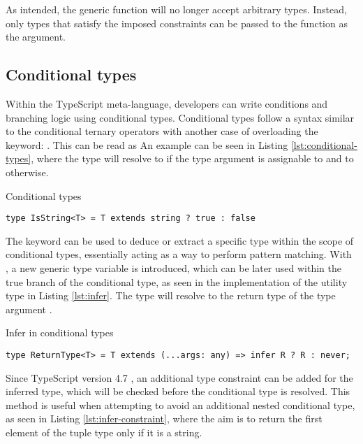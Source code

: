 As intended, the generic function will no longer accept arbitrary types. Instead, only types that satisfy the imposed constraints can be passed to the function as the argument.

\subsection{Conditional types}

Within the TypeScript meta-language, developers can write conditions and branching logic using conditional types. Conditional types follow a syntax similar to the conditional ternary operators with another case of overloading the  keyword: . This can be read as  An example can be seen in Listing \ref{lst:conditional-types}, where the  type will resolve to  if the type argument  is assignable to  and to  otherwise.

\begin{listing}[ht]
  \caption{Conditional types}\label{lst:conditional-types}
  \begin{verbatim}
type IsString<T> = T extends string ? true : false
\end{verbatim}
\end{listing}

The  keyword can be used to deduce or extract a specific type within the scope of conditional types, essentially acting as a way to perform pattern matching. With , a new generic type variable is introduced, which can be later used within the true branch of the conditional type, as seen in the implementation of the  utility type in Listing \ref{lst:infer}. The  type will resolve to the return type of the type argument .

\begin{listing}[ht]
  \caption{Infer in conditional types}\label{lst:infer}
  \begin{verbatim}
type ReturnType<T> = T extends (...args: any) => infer R ? R : never;
\end{verbatim}
\end{listing}

Since TypeScript version 4.7 \cite{AnnouncingTypeScript4.7}, an additional type constraint can be added for the inferred type, which will be checked before the conditional type is resolved. This method is useful when attempting to avoid an additional nested conditional type, as seen in Listing \ref{lst:infer-constraint}, where the aim is to return the first element of the tuple type only if it is a string.

